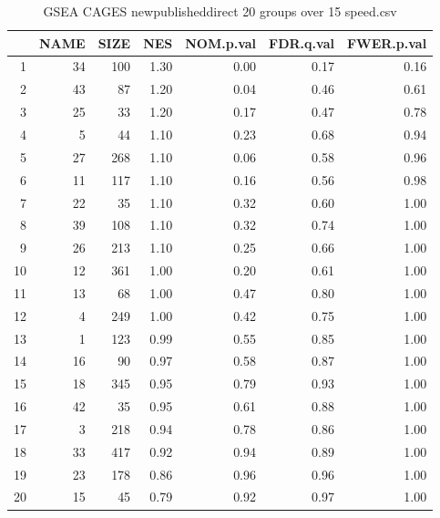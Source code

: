 \begin{table}[ht]
\centering
\begin{tabular}{rrrrrrr}
  \hline
 & NAME & SIZE & NES & NOM.p.val & FDR.q.val & FWER.p.val \\ 
  \hline
1 &  34 & 100 & 1.30 & 0.00 & 0.17 & 0.16 \\ 
  2 &  43 &  87 & 1.20 & 0.04 & 0.46 & 0.61 \\ 
  3 &  25 &  33 & 1.20 & 0.17 & 0.47 & 0.78 \\ 
  4 &   5 &  44 & 1.10 & 0.23 & 0.68 & 0.94 \\ 
  5 &  27 & 268 & 1.10 & 0.06 & 0.58 & 0.96 \\ 
  6 &  11 & 117 & 1.10 & 0.16 & 0.56 & 0.98 \\ 
  7 &  22 &  35 & 1.10 & 0.32 & 0.60 & 1.00 \\ 
  8 &  39 & 108 & 1.10 & 0.32 & 0.74 & 1.00 \\ 
  9 &  26 & 213 & 1.10 & 0.25 & 0.66 & 1.00 \\ 
  10 &  12 & 361 & 1.00 & 0.20 & 0.61 & 1.00 \\ 
  11 &  13 &  68 & 1.00 & 0.47 & 0.80 & 1.00 \\ 
  12 &   4 & 249 & 1.00 & 0.42 & 0.75 & 1.00 \\ 
  13 &   1 & 123 & 0.99 & 0.55 & 0.85 & 1.00 \\ 
  14 &  16 &  90 & 0.97 & 0.58 & 0.87 & 1.00 \\ 
  15 &  18 & 345 & 0.95 & 0.79 & 0.93 & 1.00 \\ 
  16 &  42 &  35 & 0.95 & 0.61 & 0.88 & 1.00 \\ 
  17 &   3 & 218 & 0.94 & 0.78 & 0.86 & 1.00 \\ 
  18 &  33 & 417 & 0.92 & 0.94 & 0.89 & 1.00 \\ 
  19 &  23 & 178 & 0.86 & 0.96 & 0.96 & 1.00 \\ 
  20 &  15 &  45 & 0.79 & 0.92 & 0.97 & 1.00 \\ 
   \hline
\end{tabular}
\caption{GSEA CAGES newpublisheddirect 20 groups over 15 speed.csv} 
\label{speed.csv}
\end{table}
